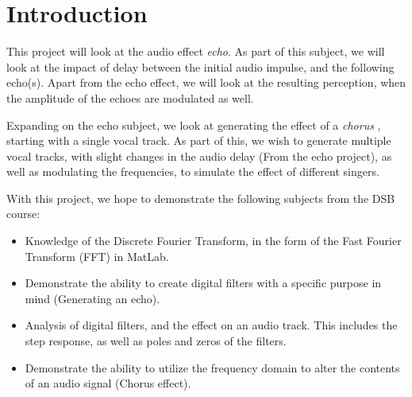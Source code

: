 
\section{Introduction}
This project will look at the audio effect \emph{echo}. As part of this subject, we will look at the impact of delay between the initial audio impulse, and the following echo(s). Apart from the echo effect, we will look at the resulting perception, when the amplitude of the echoes are modulated as well.

Expanding on the echo subject, we look at generating the effect of a \emph{chorus} , starting with a single vocal track. As part of this, we wish to generate multiple vocal tracks, with slight changes in the audio delay (From the echo project), as well as modulating the frequencies, to simulate the effect of different singers.

With this project, we hope to demonstrate the following subjects from the DSB course:
\begin{itemize}
	\item Knowledge of the Discrete Fourier Transform, in the form of the Fast Fourier Transform (FFT) in MatLab.
	\item Demonstrate the ability to create digital filters with a specific purpose in mind (Generating an echo).
	\item Analysis of digital filters, and the effect on an audio track. This includes the step response, as well as poles and zeros of the filters.
	\item Demonstrate the ability to utilize the frequency domain to alter the contents of an audio signal (Chorus effect).
\end{itemize}
